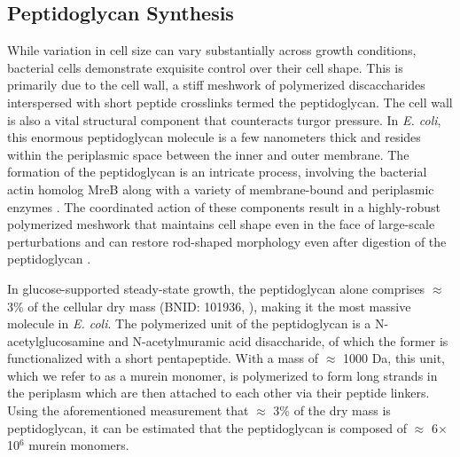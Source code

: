 \subsection{Peptidoglycan Synthesis}
While variation in cell size can vary substantially across growth conditions,
bacterial cells demonstrate exquisite control over their cell shape. This is
primarily due to the cell wall, a stiff meshwork of polymerized discaccharides
interspersed with short peptide crosslinks termed the peptidoglycan. The cell
wall is also a vital structural component that counteracts turgor pressure. In
\textit{E. coli}, this enormous peptidoglycan molecule is a few nanometers thick
and resides within the periplasmic space between the inner and outer membrane.
The formation of the peptidoglycan is an intricate process, involving the
bacterial actin homolog MreB \citep{shi2018} along with a variety of
membrane-bound and periplasmic enzymes \citep{morgenstein2015}. The coordinated
action of these components result in a highly-robust polymerized meshwork that
maintains cell shape even in the face of large-scale perturbations and can
restore rod-shaped morphology even after digestion of the peptidoglycan
\citep{harris2018,shi2018}.

In glucose-supported steady-state growth, the peptidoglycan alone comprises
$\approx$ 3\% of the cellular dry mass (BNID: 101936, \cite{milo2010}), making
it the most massive molecule in \textit{E. coli}. The polymerized unit of the
peptidoglycan is a N-acetylglucosamine and N-acetylmuramic acid disaccharide,
of which the former  is functionalized with a short pentapeptide. With a mass of
$\approx$ 1000 Da, this unit, which we refer to as a murein monomer, is
polymerized to form long strands in the periplasm which are then attached to
each other via their peptide linkers. Using the aforementioned measurement that
$\approx$ 3\% of the dry mass is peptidoglycan, it can be estimated that the
peptidoglycan is composed of $\approx$ 6$\times$10$^6$ murein monomers.

